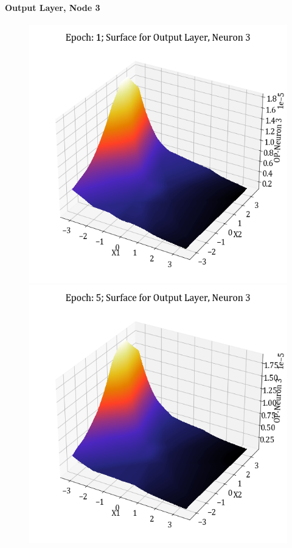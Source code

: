 \documentclass[11pt,a4paper]{article}
\begin{document}
\paragraph{Output Layer, Node 3}
\begin{figure}[H]
    \centering
    \includegraphics[scale=0.4]{images/1B_MLFFNN_E1_OP_N3.png}
    \includegraphics[scale=0.4]{images/1B_MLFFNN_E5_OP_N3.png}

\end{figure}
\end{document}
